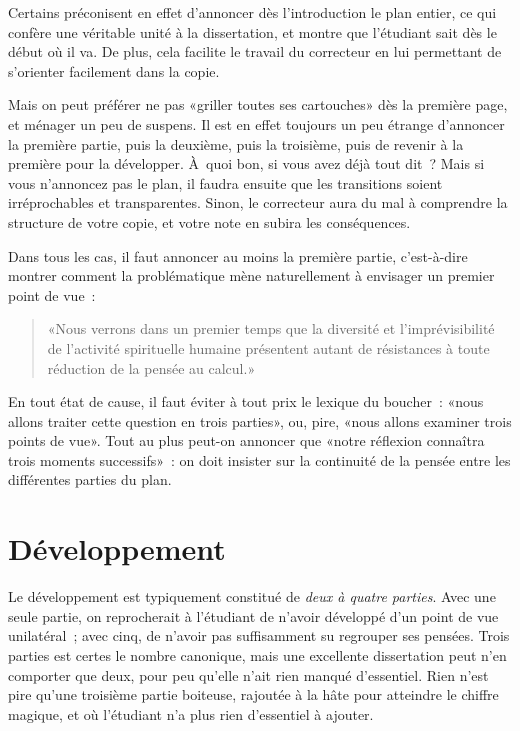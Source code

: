 \documentclass[a4paper,11pt]{article}
\newcommand{\cad}{c'est-à-dire}
\begin{document}
\par

Certains préconisent en effet d'annoncer dès l'introduction le plan
entier, ce qui confère une véritable unité à la dissertation, et montre
que l'étudiant sait dès le début où il va. De plus, cela facilite le
travail du correcteur en lui permettant de s'orienter facilement dans la
copie. 

\par

Mais on peut préférer ne pas «griller toutes ses cartouches» dès la
première page, et ménager un peu de suspens. Il est en effet toujours un
peu étrange d'annoncer la première partie, puis la deuxième, puis la
troisième, puis de revenir à la première pour la développer. À~quoi bon,
si vous avez déjà tout dit~? Mais si vous n'annoncez pas le plan, il
faudra ensuite que les transitions soient irréprochables et
transparentes. Sinon, le correcteur aura du mal à comprendre la
structure de votre copie, et votre note en subira les conséquences.

\par

Dans tous les cas, il faut annoncer au moins la première partie, \cad{}
montrer comment la problématique mène naturellement à envisager un
premier point de vue~:
\begin{quote}
  «Nous verrons dans un premier temps que la diversité et
  l'imprévisibilité de l'activité spirituelle humaine présentent autant
  de résistances à toute réduction de la pensée au calcul.»
\end{quote}

\par

En tout état de cause, il faut éviter à tout prix le lexique du
boucher~: «nous allons traiter cette question en trois parties», ou,
pire, «nous allons examiner trois points de vue». Tout au plus peut-on
annoncer que «notre réflexion connaîtra trois moments successifs»~: on
doit insister sur la continuité de la pensée entre les différentes
parties du plan.


\section{Développement}

Le développement est typiquement constitué de \emph{deux à quatre
  parties}. Avec une seule partie, on reprocherait à l'étudiant de
n'avoir développé d'un point de vue unilatéral~; avec cinq, de n'avoir
pas suffisamment su regrouper ses pensées. Trois parties est certes le
nombre canonique, mais une excellente dissertation peut n'en comporter
que deux, pour peu qu'elle n'ait rien manqué d'essentiel. Rien n'est
pire qu'une troisième partie boiteuse, rajoutée à la hâte pour atteindre
le chiffre magique, et où l'étudiant n'a plus rien d'essentiel à
ajouter.
\end{document}
